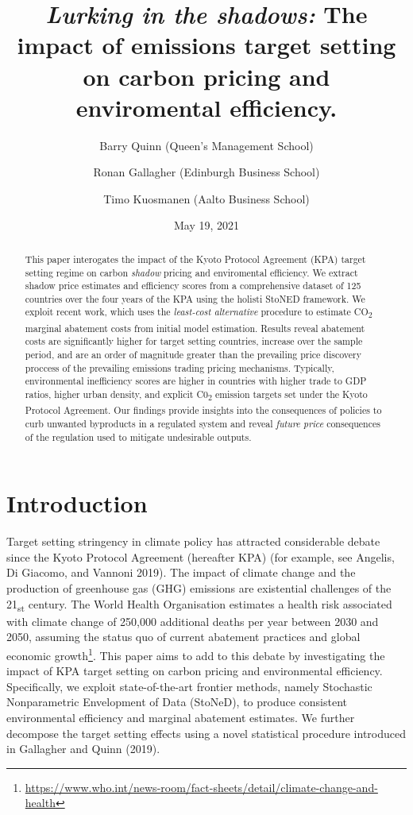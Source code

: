 \documentclass[
  10pt,
]{article}
\title{\emph{Lurking in the shadows:} The impact of emissions target setting on
carbon pricing and enviromental efficiency.}
\author{Barry Quinn (Queen's Management School) \and Ronan Gallagher (Edinburgh Business School) \and Timo Kuosmanen (Aalto Business School)}
\date{May 19, 2021}
\begin{document}
\maketitle
\begin{abstract}
This paper interogates the impact of the Kyoto Protocol Agreement (KPA)
target setting regime on carbon \emph{shadow} pricing and enviromental
efficiency. We extract shadow price estimates and efficiency scores from
a comprehensive dataset of 125 countries over the four years of the KPA
using the holisti StoNED framework. We exploit recent work, which uses
the \emph{least-cost alternative} procedure to estimate
CO\textsubscript{2} marginal abatement costs from initial model
estimation. Results reveal abatement costs are significantly higher for
target setting countries, increase over the sample period, and are an
order of magnitude greater than the prevailing price discovery proccess
of the prevailing emissions trading pricing mechanisms. Typically,
environmental inefficiency scores are higher in countries with higher
trade to GDP ratios, higher urban density, and explicit
C0\textsubscript{2} emission targets set under the Kyoto Protocol
Agreement. Our findings provide insights into the consequences of
policies to curb unwanted byproducts in a regulated system and reveal
\emph{future price} consequences of the regulation used to mitigate
undesirable outputs.
\end{abstract}

\hypertarget{introduction}{%
\section{Introduction}\label{introduction}}

Target setting stringency in climate policy has attracted considerable
debate since the Kyoto Protocol Agreement (hereafter KPA) (for example,
see Angelis, Di Giacomo, and Vannoni 2019). The impact of climate change
and the production of greenhouse gas (GHG) emissions are existential
challenges of the 21\textsubscript{st} century. The World Health
Organisation estimates a health risk associated with climate change of
250,000 additional deaths per year between 2030 and 2050, assuming the
status quo of current abatement practices and global economic
growth\footnote{\url{https://www.who.int/news-room/fact-sheets/detail/climate-change-and-health}}.
This paper aims to add to this debate by investigating the impact of KPA
target setting on carbon pricing and environmental efficiency.
Specifically, we exploit state-of-the-art frontier methods, namely
Stochastic Nonparametric Envelopment of Data (StoNeD), to produce
consistent environmental efficiency and marginal abatement estimates. We
further decompose the target setting effects using a novel statistical
procedure introduced in Gallagher and Quinn (2019).
\end{document}
